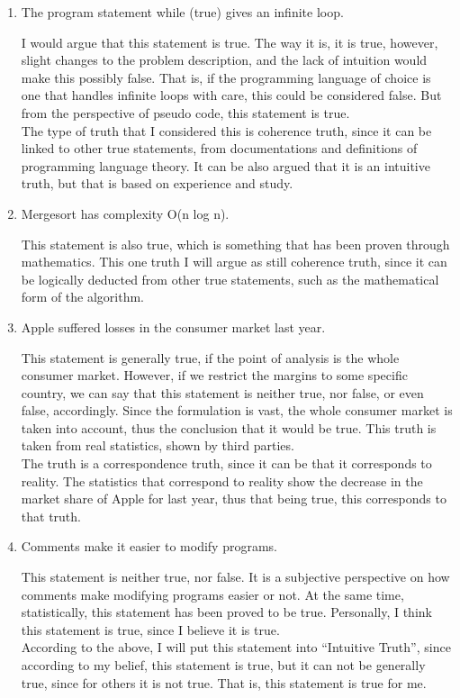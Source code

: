 \documentclass[english]{report}
\begin{document}
\begin{enumerate}
  
\item The program statement while (true) {} gives an infinite loop.

  I would argue that this statement is true. The way it is, it is true, however, slight changes to the problem description, and the lack of intuition would make this possibly false. That is, if the programming language of choice is one that handles infinite loops with care, this could be considered false. But from the perspective of pseudo code, this statement is true.
\\
  The type of truth that I considered this is coherence truth, since it can be linked to other true statements, from documentations and definitions of programming language theory. It can be also argued that it is an intuitive truth, but that is based on experience and study.
  
\item Mergesort has complexity O(n log n).

  This statement is also true, which is something that has been proven through mathematics. This one truth I will argue as still coherence truth, since it can be logically deducted from other true statements, such as the mathematical form of the algorithm.

\item Apple suffered losses in the consumer market last year.

  This statement is generally true, if the point of analysis is the whole consumer market. However, if we restrict the margins to some specific country, we can say that this statement is neither true, nor false, or even false, accordingly. Since the formulation is vast, the whole consumer market is taken into account, thus the conclusion that it would be true. This truth is taken from real statistics, shown by third parties.
  \\
  The truth is a correspondence truth, since it can be that it corresponds to reality. The statistics that correspond to reality show the decrease in the market share of Apple for last year, thus that being true, this corresponds to that truth. 

\item Comments make it easier to modify programs.

  This statement is neither true, nor false. It is a subjective perspective on how comments make modifying programs easier or not. At the same time, statistically, this statement has been proved to be true. Personally, I think this statement is true, since I believe it is true.
  \\
  According to the above, I will put this statement into ``Intuitive Truth'', since according to my belief, this statement is true, but it can not be generally true, since for others it is not true. That is, this statement is true for me.


\end{enumerate}
\end{document}
